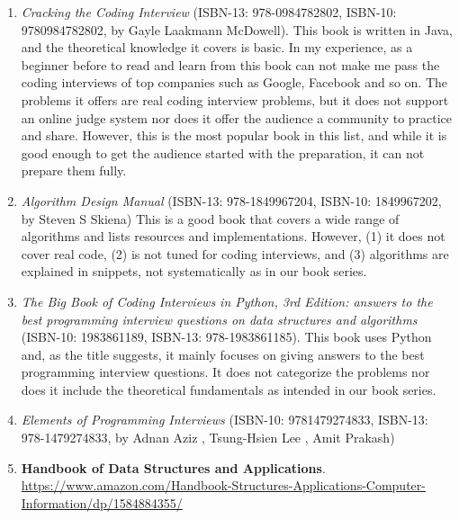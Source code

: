 \documentclass[12pt]{article}
\begin{document}
\begin{enumerate}
    \item \textit{Cracking the Coding Interview} (ISBN-13: 978-0984782802, ISBN-10: 9780984782802, by Gayle Laakmann McDowell). This book is written in Java, and the theoretical knowledge it covers is basic. In my experience, as a beginner before to read and learn from this book can not make me pass the coding interviews of top companies such as Google, Facebook and so on. The problems it offers are real coding interview problems, but it does not support an online judge system nor does it offer the audience a community to practice and share. However, this is the most popular book in this list, and while it is good enough to get the audience started with the preparation, it can not prepare them fully. 
    
    \item \textit{Algorithm Design Manual} (ISBN-13: 978-1849967204, ISBN-10: 1849967202, by Steven S Skiena) This is a good book that covers a wide range of algorithms and lists resources and implementations. However,  (1) it does not cover real code, (2) is not tuned for coding interviews, and (3) algorithms are explained in snippets, not systematically as in our book series. 
    
    \item \textit{The Big Book of Coding Interviews in Python, 3rd Edition: answers to the best programming interview questions on data structures and algorithms} (ISBN-10: 1983861189, ISBN-13: 978-1983861185). This book uses Python and, as the title suggests, it mainly focuses on giving answers to the best programming interview questions. It does not categorize the problems nor does it include the theoretical fundamentals as intended in our book series.
    
    \item \textit{Elements of Programming Interviews} (ISBN-10: 9781479274833, ISBN-13: 978-1479274833, by Adnan Aziz , Tsung-Hsien Lee , Amit Prakash)
    
    \item \textbf{
Handbook of Data Structures and Applications}. \url{https://www.amazon.com/Handbook-Structures-Applications-Computer-Information/dp/1584884355/}
\end{enumerate}
\end{document}
